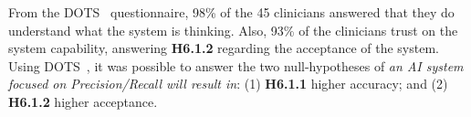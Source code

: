 


From the \ac{DOTS}~\cite{https://doi.org/10.13140/RG.2.2.23078.37448/1} questionnaire\footnotemark[41], 98\% of the 45 clinicians answered that they do understand what the system is thinking.
Also, 93\% of the clinicians trust on the system capability, answering {\bf H6.1.2} regarding the acceptance of the system.
Using \ac{DOTS}~\cite{10.1145/2898375.2898385}, it was possible to answer the two null-hypotheses of {\it an \ac{AI} system focused on Precision/Recall will result in}: (1) {\bf H6.1.1} higher accuracy; and (2) {\bf H6.1.2} higher acceptance.



